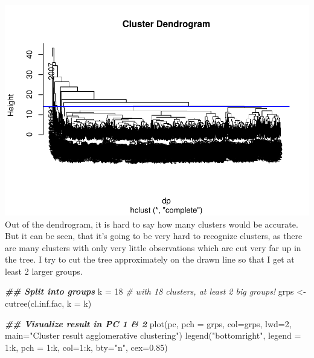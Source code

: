 \documentclass[
]{article}
\newenvironment{Shaded}{\begin{snugshade}}{\end{snugshade}}
\newcommand{\AttributeTok}[1]{\textcolor[rgb]{0.77,0.63,0.00}{#1}}
\newcommand{\CommentTok}[1]{\textcolor[rgb]{0.56,0.35,0.01}{\textit{#1}}}
\newcommand{\DecValTok}[1]{\textcolor[rgb]{0.00,0.00,0.81}{#1}}
\newcommand{\DocumentationTok}[1]{\textcolor[rgb]{0.56,0.35,0.01}{\textbf{\textit{#1}}}}
\newcommand{\FloatTok}[1]{\textcolor[rgb]{0.00,0.00,0.81}{#1}}
\newcommand{\FunctionTok}[1]{\textcolor[rgb]{0.00,0.00,0.00}{#1}}
\newcommand{\NormalTok}[1]{#1}
\newcommand{\OtherTok}[1]{\textcolor[rgb]{0.56,0.35,0.01}{#1}}
\newcommand{\SpecialCharTok}[1]{\textcolor[rgb]{0.00,0.00,0.00}{#1}}
\newcommand{\StringTok}[1]{\textcolor[rgb]{0.31,0.60,0.02}{#1}}
\begin{document}
\includegraphics{Influence_factors_files/figure-latex/3.02_aggloclust_munic-1.pdf}
Out of the dendrogram, it is hard to say how many clusters would be
accurate. But it can be seen, that it's going to be very hard to
recognize clusters, as there are many clusters with only very little
observations which are cut very far up in the tree. I try to cut the
tree approximately on the drawn line so that I get at least 2 larger
groups.

\begin{Shaded}
\begin{Highlighting}[]
\DocumentationTok{\#\# Split into groups}
\NormalTok{k }\OtherTok{=} \DecValTok{18} \CommentTok{\# with 18 clusters, at least 2 big groups!}
\NormalTok{grps }\OtherTok{\textless{}{-}} \FunctionTok{cutree}\NormalTok{(cl.inf.fac, }\AttributeTok{k =}\NormalTok{ k) }


\DocumentationTok{\#\# Visualize result in PC 1 \& 2}
\FunctionTok{plot}\NormalTok{(pc, }\AttributeTok{pch =}\NormalTok{ grps, }\AttributeTok{col=}\NormalTok{grps, }\AttributeTok{lwd=}\DecValTok{2}\NormalTok{, }\AttributeTok{main=}\StringTok{"Cluster result agglomerative clustering"}\NormalTok{) }
\FunctionTok{legend}\NormalTok{(}\StringTok{"bottomright"}\NormalTok{, }\AttributeTok{legend =} \DecValTok{1}\SpecialCharTok{:}\NormalTok{k, }\AttributeTok{pch =} \DecValTok{1}\SpecialCharTok{:}\NormalTok{k, }\AttributeTok{col=}\DecValTok{1}\SpecialCharTok{:}\NormalTok{k, }\AttributeTok{bty=}\StringTok{"n"}\NormalTok{, }\AttributeTok{cex=}\FloatTok{0.85}\NormalTok{)}
\end{Highlighting}
\end{Shaded}
\end{document}
